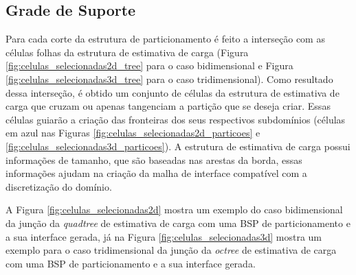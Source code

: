 \subsection{Grade de Suporte}
\label{sec:Grade_Suporte}

Para cada corte da estrutura de particionamento é feito a interseção com as células folhas da estrutura de estimativa de carga (Figura \ref{fig:celulas_selecionadas2d_tree} para o caso bidimensional e Figura \ref{fig:celulas_selecionadas3d_tree} para o caso tridimensional). Como resultado dessa interseção, é obtido um conjunto de células da estrutura de estimativa de carga que cruzam ou apenas tangenciam a partição que se deseja criar. Essas células guiarão a criação das fronteiras dos seus respectivos subdomínios (células em azul nas Figuras \ref{fig:celulas_selecionadas2d_particoes} e \ref{fig:celulas_selecionadas3d_particoes}). A estrutura de estimativa de carga possui informações de tamanho, que são baseadas nas arestas da borda, essas informações ajudam na criação da malha de interface compatível com a discretização do domínio.

A Figura \ref{fig:celulas_selecionadas2d} mostra um exemplo do caso bidimensional da junção da \textit{quadtree} de estimativa de carga com uma BSP de particionamento e a sua interface gerada, já na Figura \ref{fig:celulas_selecionadas3d} mostra um exemplo para o caso tridimensional da junção da \textit{octree} de estimativa de carga com uma BSP de particionamento e a sua interface gerada.

